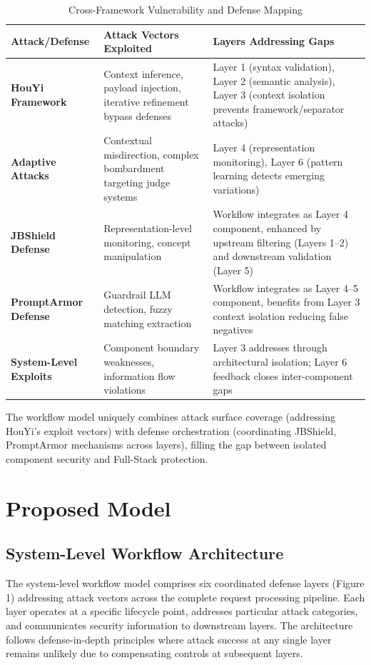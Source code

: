 \documentclass[conference]{IEEEtran}
\begin{document}
\begin{table}[t]
\caption{Cross-Framework Vulnerability and Defense Mapping}
\centering
\begin{tabular}{|l|p{5.5cm}|p{7.5cm}|}
\hline
\textbf{Attack/Defense} & \textbf{Attack Vectors Exploited} & \textbf{Layers Addressing Gaps} \\ \hline
\textbf{HouYi Framework} & Context inference, payload injection, iterative refinement bypass defenses & Layer 1 (syntax validation), Layer 2 (semantic analysis), Layer 3 (context isolation prevents framework/separator attacks) \\ \hline
\textbf{Adaptive Attacks} & Contextual misdirection, complex bombardment targeting judge systems & Layer 4 (representation monitoring), Layer 6 (pattern learning detects emerging variations) \\ \hline
\textbf{JBShield Defense} & Representation-level monitoring, concept manipulation & Workflow integrates as Layer 4 component, enhanced by upstream filtering (Layers 1--2) and downstream validation (Layer 5) \\ \hline
\textbf{PromptArmor Defense} & Guardrail LLM detection, fuzzy matching extraction & Workflow integrates as Layer 4--5 component, benefits from Layer 3 context isolation reducing false negatives \\ \hline
\textbf{System-Level Exploits} & Component boundary weaknesses, information flow violations & Layer 3 addresses through architectural isolation; Layer 6 feedback closes inter-component gaps \\ \hline
\end{tabular}
\end{table}

The workflow model uniquely combines attack surface coverage (addressing HouYi's exploit vectors) with defense orchestration (coordinating JBShield, PromptArmor mechanisms across layers), filling the gap between isolated component security and Full-Stack protection.

\section{Proposed Model}

\subsection{System-Level Workflow Architecture}
The system-level workflow model comprises six coordinated defense layers (Figure 1) addressing attack vectors across the complete request processing pipeline. Each layer operates at a specific lifecycle point, addresses particular attack categories, and communicates security information to downstream layers. The architecture follows defense-in-depth principles where attack success at any single layer remains unlikely due to compensating controls at subsequent layers.
\end{document}
